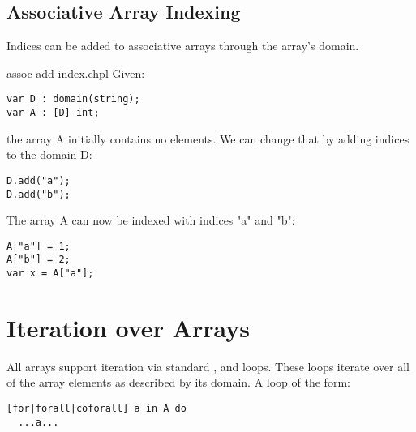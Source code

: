 \subsection{Associative Array Indexing}
\label{Associative_Array_Indexing}

Indices can be added to associative arrays through the array's domain.
\begin{chapelexample}{assoc-add-index.chpl}
Given:
\begin{chapel}
\begin{verbatim}
var D : domain(string);
var A : [D] int;
\end{verbatim}
\end{chapel}

the array A initially contains no elements. We can change that by adding
indices to the domain D:
\begin{chapel}
\begin{verbatim}
D.add("a");
D.add("b");
\end{verbatim}
\end{chapel}

The array A can now be indexed with indices "a" and "b":

\begin{chapel}
\begin{verbatim}
A["a"] = 1;
A["b"] = 2;
var x = A["a"];
\end{verbatim}
\end{chapel}
\end{chapelexample}


\section{Iteration over Arrays}
\label{Iteration_over_Arrays}

All arrays support iteration via standard , 
and  loops.  These loops iterate over all of the array
elements as described by its domain.  A loop of the form:

\begin{chapel}
\begin{verbatim}
[for|forall|coforall] a in A do
  ...a...
\end{verbatim}
\end{chapel}

